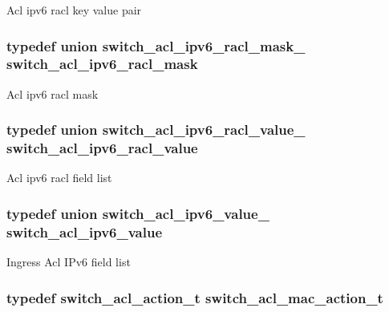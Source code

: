 Acl ipv6 racl key value pair \hypertarget{group__ACL_gaf31d1e6d533306d0c84eff01b351db3b}{
\subsubsection[{switch\+\_\+acl\+\_\+ipv6\+\_\+racl\+\_\+mask}]{\setlength{\rightskip}{0pt plus 5cm}typedef union {\bf switch\+\_\+acl\+\_\+ipv6\+\_\+racl\+\_\+mask\+\_\+}  {\bf switch\+\_\+acl\+\_\+ipv6\+\_\+racl\+\_\+mask}}}\label{group__ACL_gaf31d1e6d533306d0c84eff01b351db3b}
Acl ipv6 racl mask \hypertarget{group__ACL_gabd4501c34aa02ce20e75ca0adec4d446}{
\subsubsection[{switch\+\_\+acl\+\_\+ipv6\+\_\+racl\+\_\+value}]{\setlength{\rightskip}{0pt plus 5cm}typedef union {\bf switch\+\_\+acl\+\_\+ipv6\+\_\+racl\+\_\+value\+\_\+}  {\bf switch\+\_\+acl\+\_\+ipv6\+\_\+racl\+\_\+value}}}\label{group__ACL_gabd4501c34aa02ce20e75ca0adec4d446}
Acl ipv6 racl field list \hypertarget{group__ACL_ga05073406ded139965f11ef74332add10}{
\subsubsection[{switch\+\_\+acl\+\_\+ipv6\+\_\+value}]{\setlength{\rightskip}{0pt plus 5cm}typedef union {\bf switch\+\_\+acl\+\_\+ipv6\+\_\+value\+\_\+}  {\bf switch\+\_\+acl\+\_\+ipv6\+\_\+value}}}\label{group__ACL_ga05073406ded139965f11ef74332add10}
Ingress Acl I\+Pv6 field list \hypertarget{group__ACL_gadcc84d629bc45eb1aad21004643ee6c4}{
\subsubsection[{switch\+\_\+acl\+\_\+mac\+\_\+action\+\_\+t}]{\setlength{\rightskip}{0pt plus 5cm}typedef {\bf switch\+\_\+acl\+\_\+action\+\_\+t} {\bf switch\+\_\+acl\+\_\+mac\+\_\+action\+\_\+t}}}\label{group__ACL_gadcc84d629bc45eb1aad21004643ee6c4}
